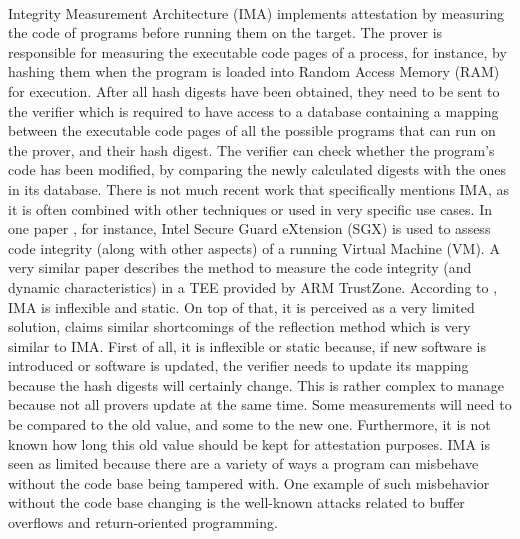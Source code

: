 \paragraph*{}
Integrity Measurement Architecture (IMA) \cite{IMA} implements attestation by measuring the code of programs before running them on the target. The prover is responsible for measuring the executable code pages of a process, for instance, by hashing them when the program is loaded into Random Access Memory (RAM) for execution. After all hash digests have been obtained, they need to be sent to the verifier which is required to have access to a database containing a mapping between the executable code pages of all the possible programs that can run on the prover, and their hash digest. The verifier can check whether the program's code has been modified, by comparing the newly calculated digests with the ones in its database. There is not much recent work that specifically mentions IMA, as it is often combined with other techniques or used in very specific use cases. In one paper \cite{DuanJialiang2020IMBo}, for instance, Intel Secure Guard eXtension (SGX) is used to assess code integrity (along with other aspects) of a running Virtual Machine (VM). A very similar paper \cite{KucabMichal2021Raai} describes the method to measure the code integrity (and dynamic characteristics) in a TEE provided by ARM TrustZone. According to \cite{AlamMasoom2012Aoer}, IMA is inflexible and static. On top of that, it is perceived as a very limited solution, \cite{AnkergardSigurdFrejJoelJorgensen2021Ssra} claims similar shortcomings of the reflection method \cite{SpinellisDiomidis2000Raam} which is very similar to IMA. First of all, it is inflexible or static because, if new software is introduced or software is updated, the verifier needs to update its mapping because the hash digests will certainly change. This is rather complex to manage because not all provers update at the same time. Some measurements will need to be compared to the old value, and some to the new one. Furthermore, it is not known how long this old value should be kept for attestation purposes. IMA is seen as limited because there are a variety of ways a program can misbehave without the code base being tampered with. One example of such misbehavior without the code base changing is the well-known attacks related to buffer overflows and return-oriented programming.

